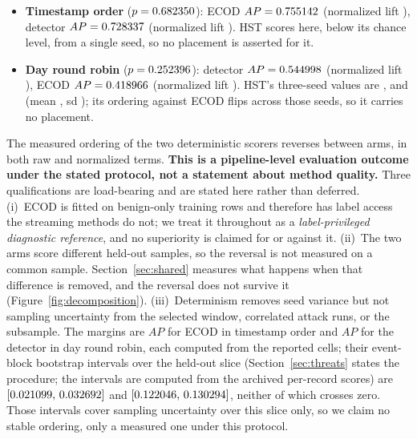 \documentclass[manuscript,anonymous,review]{acmart}
\begin{document}
\begin{itemize}
\item \textbf{Timestamp order} ($p=0.682350$): ECOD
$AP=0.755142$ (normalized lift
\SFourCicidsNaturalEcodNormLift), detector
$AP=0.728337$ (normalized lift
\SFourCicidsNaturalProposedDetectorNormLift). HST scores
\SFourCicidsNaturalHstAucpr{} here, \SFourCicidsNaturalHstLiftAbs{} below its
chance level, from a single seed, so no placement is asserted for it.
\item \textbf{Day round robin} ($p=0.252396$): detector
$AP=0.544998$ (normalized lift
\SFourCicidsSyntheticProposedDetectorNormLift), ECOD
$AP=0.418966$ (normalized lift
\SFourCicidsSyntheticEcodNormLift). HST's three-seed values are
\SFourSeedCicidsTwoZeroOneSevenInterleavedSyntheticHstDrawOne,
\SFourSeedCicidsTwoZeroOneSevenInterleavedSyntheticHstDrawTwo{} and
\SFourSeedCicidsTwoZeroOneSevenInterleavedSyntheticHstDrawThree{} (mean
\SFourSeedCicidsTwoZeroOneSevenInterleavedSyntheticHstMean, sd
\SFourSeedCicidsTwoZeroOneSevenInterleavedSyntheticHstSd); its ordering against
ECOD flips across those seeds, so it carries no placement.
\end{itemize}

The measured ordering of the two deterministic scorers reverses between arms,
in both raw and normalized terms. \textbf{This is a pipeline-level evaluation
outcome under the stated protocol, not a statement about method quality.} Three
qualifications are load-bearing and are stated here rather than deferred.
(i)~ECOD is fitted on benign-only training rows and therefore has label access
the streaming methods do not; we treat it throughout as a \emph{label-privileged
diagnostic reference}, and no superiority is claimed for or against it.
(ii)~The two arms score different held-out samples, so the reversal is not
measured on a common sample. Section~\ref{sec:shared} measures what happens
when that difference is removed, and the reversal does not survive it
(Figure~\ref{fig:decomposition}).
(iii)~Determinism removes seed variance but not sampling uncertainty from the
selected window, correlated attack runs, or the subsample. The margins are
\SFourCicidsNaturalEcodMinusDetectorAucpr{} $AP$ for ECOD in timestamp order
and \SFourCicidsSyntheticDetectorMinusEcodAucpr{} $AP$ for the detector in day
round robin, each computed from the reported cells; their event-block bootstrap
intervals over the held-out slice (Section~\ref{sec:threats} states the
procedure; the intervals are computed from the archived per-record scores) are
$[0.021099,\,0.032692]$ and
$[0.122046,\,0.130294]$, neither of
which crosses zero. Those intervals cover sampling uncertainty over this slice
only, so we claim no stable ordering, only a measured one under this protocol.
\end{document}
